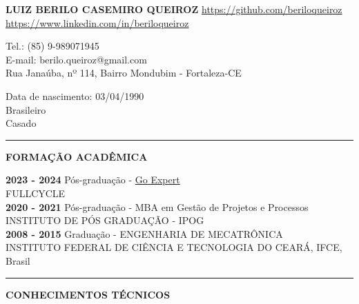 \documentclass[12pt, a4paper]{article}
\newcommand{\LlinhaG}{2pt} %
\newcommand{\TlinhaG}{17cm}  %
\begin{document}

\begin{center}
	\fontsize{14}{14}
	\textbf{LUIZ BERILO CASEMIRO QUEIROZ}
	\url{https://github.com/beriloqueiroz}
	\url{https://www.linkedin.com/in/beriloqueiroz}
\end{center}

\begin{multicols}{2}
	\begin{flushleft}
		Tel.: (85) 9-989071945\\
		E-mail: berilo.queiroz@gmail.com\\
		Rua Janaúba, nº 114,
		Bairro Mondubim - Fortaleza-CE
	\end{flushleft}
	\vfill
	\begin{flushright}
		Data de nascimento: 03/04/1990\\
		Brasileiro\\
		Casado\\
	\end{flushright}
\end{multicols}


\begin{center} %
	\rule{\TlinhaG}{\LlinhaG}
\end{center}

\begin{center}
	\textbf{FORMAÇÃO ACADÊMICA}\\
\end{center}
\begin{flushleft}
	\textbf{2023 - 2024} Pós-graduação - \href{https://goexpert.fullcycle.com.br/pos-goexpert/}{Go Expert}\\
	FULLCYCLE\\
	\hfill \break
	\textbf{2020 - 2021} Pós-graduação - MBA em Gestão de Projetos e Processos\\
	INSTITUTO DE PÓS GRADUAÇÃO - IPOG\\
	\hfill \break
	\textbf{2008 - 2015} Graduação - ENGENHARIA DE MECATRÔNICA\\
	INSTITUTO FEDERAL DE CIÊNCIA E TECNOLOGIA DO CEARÁ, IFCE, Brasil\\
\end{flushleft}

\begin{center}	%
	\rule{\TlinhaG}{\LlinhaG}
\end{center}

\begin{center}
	\textbf{CONHECIMENTOS TÉCNICOS}\\
\end{center}
\end{document}
